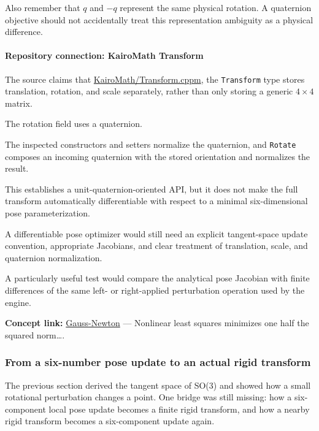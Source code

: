 Also remember that \(q\) and \(-q\) represent the same physical rotation. A quaternion objective should not accidentally treat this representation ambiguity as a physical difference.

\paragraph{Repository connection: KairoMath Transform}\label{02-foundations-ii-ch027-repository-connection-kairomath-transform}

The source claims that \href{https://github.com/swayam8624/KairoMath/blob/master/Transform.cppm?utm_source=chatgpt.com}{KairoMath/Transform.cppm}, the \texttt{Transform} type stores translation, rotation, and scale separately, rather than only storing a generic \(4\times4\) matrix.

The rotation field uses a quaternion.

The inspected constructors and setters normalize the quaternion, and \texttt{Rotate} composes an incoming quaternion with the stored orientation and normalizes the result.

This establishes a unit-quaternion-oriented API, but it does not make the full transform automatically differentiable with respect to a minimal six-dimensional pose parameterization.

A differentiable pose optimizer would still need an explicit tangent-space update convention, appropriate Jacobians, and clear treatment of translation, scale, and quaternion normalization.

A particularly useful test would compare the analytical pose Jacobian with finite differences of the same left- or right-applied perturbation operation used by the engine.

\textbf{Concept link:} \hyperref[02-foundations-ii-ch026-optimization-and-inverse-problems]{Gauss-Newton} --- Nonlinear least squares minimizes one half the squared norm\ldots.

\subsubsection{From a six-number pose update to an actual rigid transform}\label{02-foundations-ii-ch027-from-a-six-number-pose-update-to-an-actual-rigid-transform}

The previous section derived the tangent space of SO(3) and showed how a small rotational perturbation changes a point. One bridge was still missing: how a six-component local pose update becomes a finite rigid transform, and how a nearby rigid transform becomes a six-component update again.

